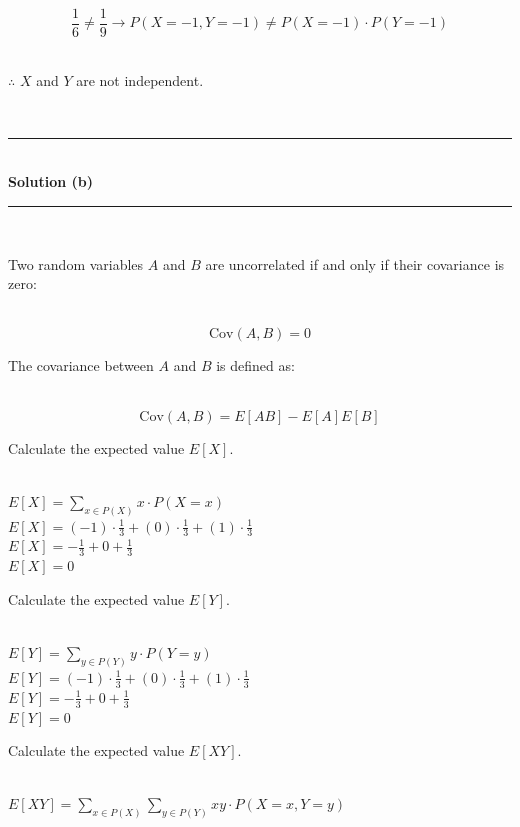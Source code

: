 \documentclass{article}
\begin{document}
$$ \frac{1}{6} \neq \frac{1}{9} \rightarrow P(X = -1, Y = -1) \neq P(X = -1) \cdot P(Y = -1)$$\\

\parbox{\textwidth}{$\therefore$ $X$ and $Y$ are not independent.}\\

\noindent\rule{\textwidth}{0.4pt}\\

\textbf{Solution (b)}

\noindent\rule{\textwidth}{0.4pt}\\

\parbox{\textwidth}{Two random variables $A$ and $B$ are uncorrelated if and only if their covariance is zero:}\\

$$\text{Cov}(A, B) = 0$$

\parbox{\textwidth}{The covariance between $A$ and $B$ is defined as:}\\

$$\text{Cov}(A, B) = E[AB] - E[A]E[B]$$

\parbox{\textwidth}{Calculate the expected value $E[X]$.}\\

$E[X] = \sum_{x \in P(X)} x \cdot P(X = x)$\\

$E[X] = (-1) \cdot \frac{1}{3} + (0) \cdot \frac{1}{3} + (1) \cdot \frac{1}{3}$\\

$E[X] = -\frac{1}{3} + 0 + \frac{1}{3}$\\

$E[X] = 0$\\

\parbox{\textwidth}{Calculate the expected value $E[Y]$.}\\

$E[Y] = \sum_{y \in P(Y)} y \cdot P(Y = y)$\\

$E[Y] = (-1) \cdot \frac{1}{3} + (0) \cdot \frac{1}{3} + (1) \cdot \frac{1}{3}$\\

$E[Y] = -\frac{1}{3} + 0 + \frac{1}{3}$\\

$E[Y] = 0$\\

\parbox{\textwidth}{Calculate the expected value $E[XY]$.}\\

$E[XY] = \sum_{x \in P(X)} \sum_{y \in P(Y)} xy \cdot P(X = x, Y = y)$\\
\end{document}

